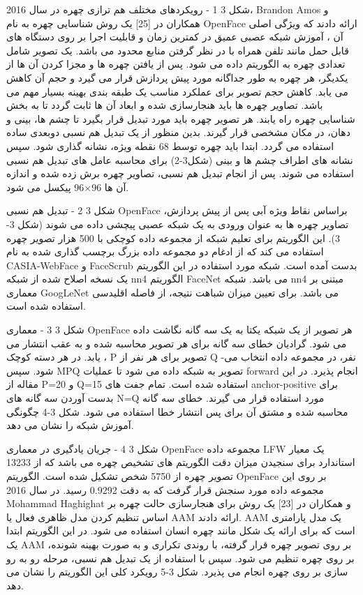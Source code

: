 شکل ‏3 1 - رویکردهای مختلف هم ترازی چهره
در سال 2016، Brandon Amos و همکاران در [25] یک روش شناسایی چهره به نام OpenFace ارائه دادند که ویژگی اصلی آن ، آموزش شبکه عصبی عمیق در کمترین زمان و قابلیت اجرا بر روی دستگاه های قابل حمل مانند تلفن همراه با در نظر گرفتن منابع محدود می باشد. یک تصویر شامل تعدادی چهره به الگوریتم داده می شود. پس از یافتن چهره ها و مجزا کردن  آن ها از یکدیگر، هر چهره به طور جداگانه مورد پیش پردازش  قرار می گیرد و حجم آن کاهش می یابد. کاهش حجم تصویر برای عملکرد مناسب یک طبقه بندی بهینه بسیار مهم می باشد. تصاویر چهره ها باید هنجارسازی شده و ابعاد آن ها ثابت گردد تا به بخش شناسایی چهره راه یابند.
هر تصویر چهره باید مورد تبدیل قرار بگیرد تا چشم ها، بینی و دهان، در مکان مشخصی قرار گیرند. بدین منظور از یک تبدیل هم نسبی  دوبعدی ساده استفاده می گردد. ابتدا باید چهره توسط 68 نقطه ویژه، نشانه گذاری شود. سپس نشانه های اطراف چشم ها و بینی (شکل3-2) برای محاسبه عامل های تبدیل هم نسبی استفاده می شوند. پس از انجام تبدیل هم نسبی، تصاویر چهره برش زده شده و اندازه آن ها 96×96 پیکسل می شود.
 
شکل ‏3 2 - تبدیل هم نسبی OpenFace براساس نقاط ویژه آبی 
پس از پیش پردازش، تصاویر چهره ها به عنوان ورودی به یک شبکه عصبی پیچشی داده می شوند (شکل 3-3). این الگوریتم برای تعلیم شبکه از مجموعه داده کوچکی با 500 هزار تصویر چهره استفاده می کند که از ادغام دو مجموعه داده بزرگ برچسب گذاری شده به نام CASIA-WebFace و FaceScrub بدست آمده است. شبکه مورد استفاده در این الگوریتم یک نسخه اصلاح شده از شبکه nn4 الگوریتم FaceNet می باشد. شبکه nn4 مبتنی بر معماری GoogLeNet می باشد. برای تعیین میزان شباهت نتیجه، از فاصله اقلیدسی استفاده شده است.
 
شکل ‏3 3 - معماری OpenFace
هر تصویر از یک شبکه یکتا به یک سه گانه نگاشت داده می شود. گرادیان خطای سه گانه برای هر تصویر محاسبه شده و به عقب انتشار می یابد. در هر دسته کوچک ، P تصویر برای هر نفر از Q نفر، در مجموعه داده انتخاب می-شود. سپس M\approx PQ تصویر به شبکه داده می شود تا عملیات forward انجام پذیرد. در این مقاله از P=20 و Q=15 استفاده شده است. تمام جفت های anchor-positive برای بدست آوردن سه گانه های N=Q مورد استفاده قرار می گیرند. خطای سه گانه محاسبه شده و مشتق آن برای پس انتشار خطا استفاده می شود. شکل 3-4 چگونگی آموزش شبکه را نشان می دهد.
 
شکل ‏3 4 - جریان یادگیری در معماری OpenFace
مجموعه داده LFW  یک معیار استاندارد برای سنجیدن میزان دقت الگوریتم های تشخیص چهره می باشد که از 13233 تصویر چهره از 5750 شخص تشکیل شده است. الگوریتم OpenFace بر روی این مجموعه داده مورد سنجش قرار گرفت که به دقت 0.9292 رسید.
در سال 2016 Mohammad Haghighat و همکاران در [23] یک روش برای هنجارسازی حالت چهره بر اساس تنظیم کردن مدل  ظاهری فعال  یا AAM ارائه دادند. AAM یک مدل پارامتری است که برای ارائه یک شکل مانند چهره انسان استفاده می شود. در این الگوریتم ابتدا یک AAM بر روی تصویر چهره قرار گرفته، با روندی تکراری و به صورت بهینه شونده، بر روی چهره تنظیم می شود. سپس با استفاده از یک تبدیل هم نسبی، مرحله رو به رو سازی بر روی چهره انجام می پذیرد. شکل 3-5 رویکرد کلی این الگوریتم را نشان می دهد. 
 
